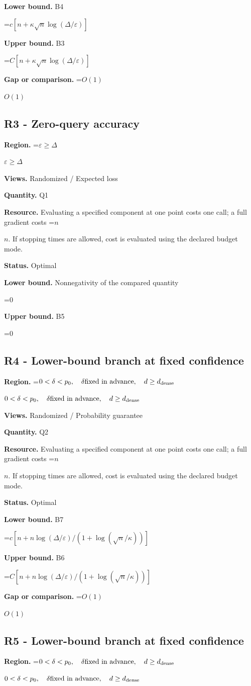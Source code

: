 \documentclass[10pt,a4paper]{article}
\newcommand{\AtlasMath}[1]{\par\begingroup\centering\setbox0=\hbox{$\displaystyle #1$}\ifdim\wd0>1.4\linewidth\typeout{ATLAS WIDE FORMULA: \the\wd0}\fi\ifdim\wd0>\linewidth\resizebox{\linewidth}{!}{\box0}\else\box0\fi\par\endgroup}
\newcommand{\AtlasInlineMath}[1]{\begingroup\setbox0=\hbox{$#1$}\ifdim\wd0>.4\linewidth\endgroup\AtlasMath{#1}\else\endgroup$#1$\fi}
\begin{document}
\textbf{Lower bound.} B4

\AtlasMath{c[n+\kappa\sqrt n\log(\Delta/\varepsilon)]}
\textbf{Upper bound.} B3

\AtlasMath{C[n+\kappa\sqrt n\log(\Delta/\varepsilon)]}
\textbf{Gap or comparison.} \AtlasInlineMath{O(1)}

\subsection{R3 - Zero-query accuracy}
\textbf{Region.} \AtlasInlineMath{\varepsilon\ge\Delta}

\textbf{Views.} Randomized / Expected loss

\textbf{Quantity.} Q1

\textbf{Resource.} Evaluating a specified component at one point costs one call; a full gradient costs \AtlasInlineMath{n}. If stopping times are allowed, cost is evaluated using the declared budget mode.

\textbf{Status.} Optimal

\textbf{Lower bound.} Nonnegativity of the compared quantity

\AtlasMath{0}
\textbf{Upper bound.} B5

\AtlasMath{0}
\subsection{R4 - Lower-bound branch at fixed confidence}
\textbf{Region.} \AtlasInlineMath{0<\delta<p_0,\quad\delta\text{fixed in advance},\quad d\ge d_{\rm dense}}

\textbf{Views.} Randomized / Probability guarantee

\textbf{Quantity.} Q2

\textbf{Resource.} Evaluating a specified component at one point costs one call; a full gradient costs \AtlasInlineMath{n}. If stopping times are allowed, cost is evaluated using the declared budget mode.

\textbf{Status.} Optimal

\textbf{Lower bound.} B7

\AtlasMath{c[n+n\log(\Delta/\varepsilon)/(1+\log(\sqrt n/\kappa))]}
\textbf{Upper bound.} B6

\AtlasMath{C[n+n\log(\Delta/\varepsilon)/(1+\log(\sqrt n/\kappa))]}
\textbf{Gap or comparison.} \AtlasInlineMath{O(1)}

\subsection{R5 - Lower-bound branch at fixed confidence}
\textbf{Region.} \AtlasInlineMath{0<\delta<p_0,\quad\delta\text{fixed in advance},\quad d\ge d_{\rm dense}}
\end{document}

